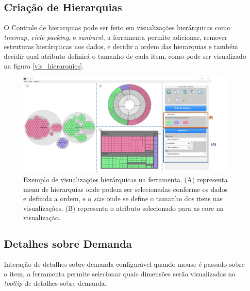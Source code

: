 \documentclass[
	12pt,				%
	openright,			%
	oneside,			%
	a4paper,			%
	english,			%
	brazil				%
	]{abntex2}
\begin{document}
\subsection{Criação de Hierarquias}
O Controle de hierarquias pode ser feito em visualizações hierárquicas como \textit{treemap}, \textit{cicle packing}, e \textit{sunburst}, a ferramenta permite adicionar, remover estruturas hierárquicas nos dados, e decidir a ordem das hierarquias e também decidir qual atributo definirá o tamanho de cada item, como pode ser visualizado na figura \autoref{vis_hierarquies}. 


\begin{figure}[h]
	\caption{\label{vis_hierarquies} Exemplo de visualizações hierárquicas na ferramenta. (A) representa menu de hierarquias onde podem ser selecionadas conforme os dados e definida a ordem, e o \textit{size} onde se define o tamanho dos itens nas visualizações. (B) representa o atributo selecionado para as core na visualização.
}
	\begin{center}
	    \includegraphics[width=\textwidth,scale=1]{figures/hierarquias.png}
	\end{center}
\end{figure}

\subsection{Detalhes sobre Demanda}
Interação de detalhes sobre demanda configurável quando mouse é passado sobre o item, a ferramenta permite selecionar quais dimensões serão visualizadas no \textit{tooltip} de detalhes sobre demanda.
\end{document}
